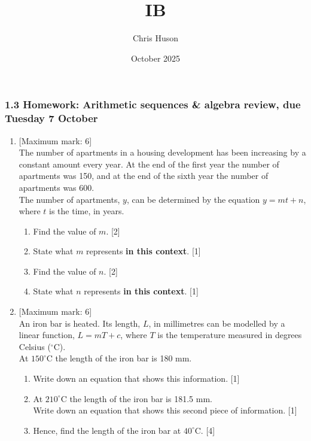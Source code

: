 \documentclass[12pt, twoside]{article}
\title{IB}
\author{Chris Huson}
\date{October 2025}
\begin{document}
\subsubsection*{1.3 Homework: Arithmetic sequences \& algebra review, due Tuesday 7 October}
\begin{enumerate}[itemsep=0.5cm]
\item {[Maximum mark: 6]} \\[0.3cm]
    The number of apartments in a housing development has been increasing by a constant amount every year. At the end of the first year the number of apartments was 150, and at the end of the sixth year the number of apartments was 600. \\[0.25cm]
    The number of apartments, $y$, can be determined by the equation $y=mt+n$, where $t$ is the time, in years.
    \begin{enumerate}[itemsep=0.25cm]
        \item Find the value of $m$. \hfill [2]
        \item State what $m$ represents \textbf{in this context}. \hfill [1]
        \item Find the value of $n$. \hfill [2]
        \item State what $n$ represents \textbf{in this context}. \hfill [1]
    \end{enumerate}

\newpage
\item {[Maximum mark: 6]} \\[0.3cm]
    An iron bar is heated. Its length, $L$, in millimetres can be modelled by a linear function, $L=mT+c$, where $T$ is the temperature measured in degrees Celsius ($^\circ$C). \\[0.25cm]
    At $150^\circ$C the length of the iron bar is 180 mm.
    \begin{enumerate}[itemsep=0.25cm]
        \item Write down an equation that shows this information. \hfill [1]
        \item At $210^\circ$C the length of the iron bar is 181.5 mm. \\[0.25cm]
        Write down an equation that shows this second piece of information. \hfill [1]
        \item Hence, find the length of the iron bar at $40^\circ$C. \hfill [4]
    \end{enumerate}


\end{enumerate}
\end{document}
